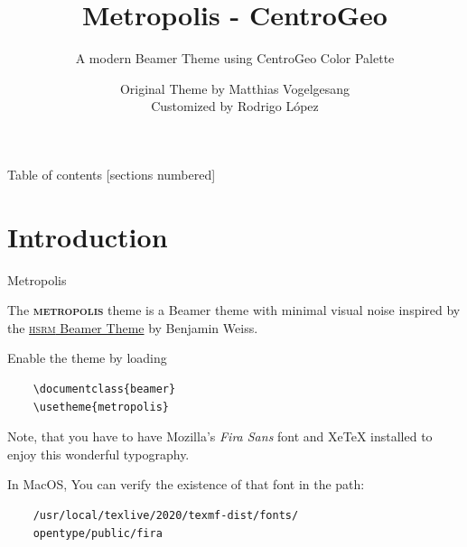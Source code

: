 \documentclass[10pt]{beamer}
\title{Metropolis - CentroGeo}
\subtitle{A modern Beamer Theme using CentroGeo Color Palette}
\date{}
\author{Original Theme by Matthias Vogelgesang \\ Customized by Rodrigo López}
\institute{Centro de Investigación en
Ciencias de Información Geoespacial}
\newcommand{\themename}{\textbf{\textsc{metropolis}}\xspace}
\begin{document}
\maketitle

\begin{frame}{Table of contents}
  [sections numbered]
  \tableofcontents%
\end{frame}



\section[Intro]{Introduction}

\begin{frame}[fragile]{Metropolis}

  The \themename theme is a Beamer theme with minimal visual noise
  inspired by the \href{https://github.com/hsrmbeamertheme/hsrmbeamertheme}{\textsc{hsrm} Beamer
  Theme} by Benjamin Weiss.

  Enable the theme by loading

  \begin{verbatim}    \documentclass{beamer}
    \usetheme{metropolis}\end{verbatim}

  Note, that you have to have Mozilla's \emph{Fira Sans} font and XeTeX
  installed to enjoy this wonderful typography.
  
  In MacOS, You can verify the existence of that font in the path:
    \footnotesize{
    \begin{verbatim}    
    /usr/local/texlive/2020/texmf-dist/fonts/
    opentype/public/fira
    
    \end{verbatim}
    }
  
\end{frame}
\end{document}
